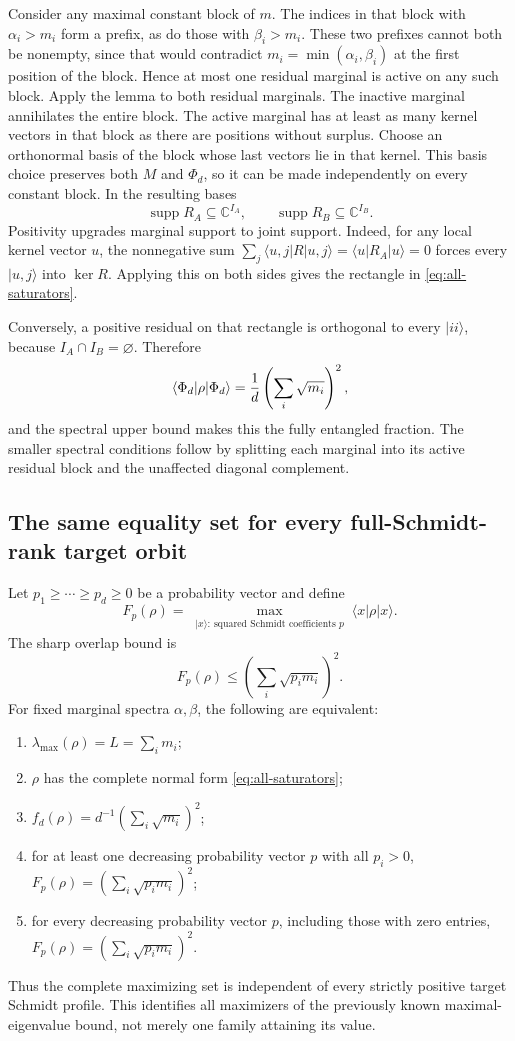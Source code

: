 Consider any maximal constant block of $m$. The indices in that block with
$\alpha_i>m_i$ form a prefix, as do those with $\beta_i>m_i$. These two
prefixes cannot both be nonempty, since that would contradict
$m_i=\min(\alpha_i,\beta_i)$ at the first position of the block. Hence
at most one residual marginal is active on any such block. Apply the lemma
to both residual marginals. The inactive marginal annihilates the entire
block. The active marginal has at least as many kernel vectors in that
block as there are positions without surplus. Choose an orthonormal basis
of the block whose last vectors lie in that kernel. This basis choice
preserves both $M$ and $\Phi_d$, so it can be made independently on every
constant block. In the resulting bases
\[
 \operatorname{supp}R_A\subseteq\mathbb C^{I_A},\qquad
 \operatorname{supp}R_B\subseteq\mathbb C^{I_B}.
\]
Positivity upgrades marginal support to joint support. Indeed, for any local
kernel vector $u$, the nonnegative sum
$\sum_j\langle u,j|R|u,j\rangle=\langle u|R_A|u\rangle=0$
forces every $|u,j\rangle$ into $\ker R$. Applying this on both sides
gives the rectangle in \eqref{eq:all-saturators}.

Conversely, a positive residual on that rectangle is orthogonal to every
$|ii\rangle$, because $I_A\cap I_B=\varnothing$. Therefore
\[
 \langle\Phi_d|\rho|\Phi_d\rangle
       ={1\over d}\left(\sum_i\sqrt{m_i}\right)^2,
\]
and the spectral upper bound makes this the fully entangled fraction.
The smaller spectral conditions follow by splitting each marginal into
its active residual block and the unaffected diagonal complement.

\subsection{The same equality set for every full-Schmidt-rank target orbit}

Let $p_1\ge\cdots\ge p_d\ge0$ be a probability vector and define
\[
 F_p(\rho)=\max_{\substack{|x\rangle:\ \text{squared Schmidt coefficients }p}}
                  \langle x|\rho|x\rangle.
\]
The sharp overlap bound is
\[
 F_p(\rho)\le\left(\sum_i\sqrt{p_i m_i}\right)^2.
\]
For fixed marginal spectra $\alpha,\beta$, the following are equivalent:
\begin{enumerate}
\item $\lambda_{\max}(\rho)=L=\sum_i m_i$;
\item $\rho$ has the complete normal form \eqref{eq:all-saturators};
\item $f_d(\rho)=d^{-1}(\sum_i\sqrt{m_i})^2$;
\item for at least one decreasing probability vector $p$ with all $p_i>0$,
      $F_p(\rho)=(\sum_i\sqrt{p_i m_i})^2$;
\item for every decreasing probability vector $p$, including those with zero entries,
      $F_p(\rho)=(\sum_i\sqrt{p_i m_i})^2$.
\end{enumerate}
Thus the complete maximizing set is independent of every strictly positive
target Schmidt profile. This identifies all maximizers of the previously
known maximal-eigenvalue bound, not merely one family attaining its value.

